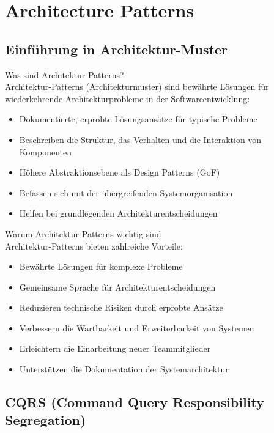 \section{Architecture Patterns}

\subsection{Einführung in Architektur-Muster}

\begin{definition}{Was sind Architektur-Patterns?}\\
    Architektur-Patterns (Architekturmuster) sind bewährte Lösungen für wiederkehrende Architekturprobleme in der Softwareentwicklung:
    \begin{itemize}
        \item Dokumentierte, erprobte Lösungsansätze für typische Probleme
        \item Beschreiben die Struktur, das Verhalten und die Interaktion von Komponenten
        \item Höhere Abstraktionsebene als Design Patterns (GoF)
        \item Befassen sich mit der übergreifenden Systemorganisation
        \item Helfen bei grundlegenden Architekturentscheidungen
    \end{itemize}
\end{definition}

\begin{concept}{Warum Architektur-Patterns wichtig sind}\\
    Architektur-Patterns bieten zahlreiche Vorteile:
    \begin{itemize}
        \item Bewährte Lösungen für komplexe Probleme
        \item Gemeinsame Sprache für Architekturentscheidungen
        \item Reduzieren technische Risiken durch erprobte Ansätze
        \item Verbessern die Wartbarkeit und Erweiterbarkeit von Systemen
        \item Erleichtern die Einarbeitung neuer Teammitglieder
        \item Unterstützen die Dokumentation der Systemarchitektur
    \end{itemize}
\end{concept}

\subsection{CQRS (Command Query Responsibility Segregation)}

